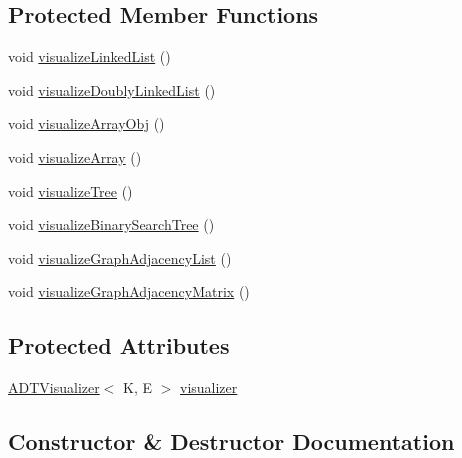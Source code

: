 \subsection*{Protected Member Functions}
\begin{DoxyCompactItemize}
\item 
void \hyperlink{classbridges_1_1connect_1_1_bridges_ae9ce2673d2eef1da7f6e1359c494f6fe}{visualize\+Linked\+List} ()
\item 
void \hyperlink{classbridges_1_1connect_1_1_bridges_ac1ac1db8cf7123aefb83ab05af83375d}{visualize\+Doubly\+Linked\+List} ()
\item 
void \hyperlink{classbridges_1_1connect_1_1_bridges_a7533ebb339527a3a824fc7af21a1d5c9}{visualize\+Array\+Obj} ()
\item 
void \hyperlink{classbridges_1_1connect_1_1_bridges_ac4e90699b288fcfbaf19e59bc4dbafb3}{visualize\+Array} ()
\item 
void \hyperlink{classbridges_1_1connect_1_1_bridges_abd8fa1ef8d6c5d3e6c533ee069d24d85}{visualize\+Tree} ()
\item 
void \hyperlink{classbridges_1_1connect_1_1_bridges_a283d29561d78a890f01c8735c18d17d0}{visualize\+Binary\+Search\+Tree} ()
\item 
void \hyperlink{classbridges_1_1connect_1_1_bridges_a7470f7a358eee6a6cded3ab42f8b9cdc}{visualize\+Graph\+Adjacency\+List} ()
\item 
void \hyperlink{classbridges_1_1connect_1_1_bridges_a13c154c2a656dd4c19f2ff0e767f63c3}{visualize\+Graph\+Adjacency\+Matrix} ()
\end{DoxyCompactItemize}
\subsection*{Protected Attributes}
\begin{DoxyCompactItemize}
\item 
\hyperlink{classbridges_1_1base_1_1_a_d_t_visualizer}{A\+D\+T\+Visualizer}$<$ K, E $>$ \hyperlink{classbridges_1_1connect_1_1_bridges_af3fc35779b31c976ed8bf2e173310502}{visualizer}
\end{DoxyCompactItemize}


\subsection{Constructor \& Destructor Documentation}
\hypertarget{classbridges_1_1connect_1_1_bridges_a4925cf146eff9ff84e89351ab574795d}{}\label{classbridges_1_1connect_1_1_bridges_a4925cf146eff9ff84e89351ab574795d} 
